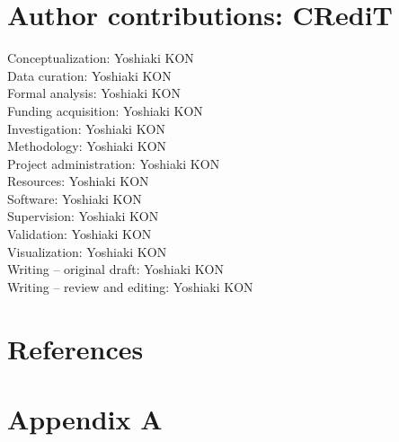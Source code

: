 \documentclass[preprint,12pt]{elsarticle}
\begin{document}
\section{Author contributions: CRediT}
Conceptualization: Yoshiaki KON \\
Data curation: Yoshiaki KON \\
Formal analysis: Yoshiaki KON \\
Funding acquisition: Yoshiaki KON \\
Investigation: Yoshiaki KON \\
Methodology: Yoshiaki KON \\
Project administration: Yoshiaki KON \\
Resources: Yoshiaki KON \\
Software: Yoshiaki KON \\
Supervision: Yoshiaki KON \\
Validation: Yoshiaki KON \\
Visualization: Yoshiaki KON \\
Writing – original draft: Yoshiaki KON \\
Writing – review and editing: Yoshiaki KON

\section*{References}



\appendix
\section{Appendix A}
\end{document}
